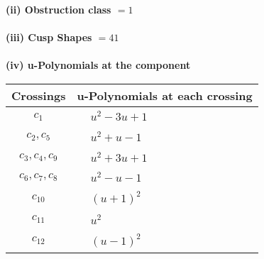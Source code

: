 \documentclass[1p]{elsarticle_modified}
\theoremstyle{definition}
\begin{document}
\flushleft \textbf{(ii) Obstruction class $= 1$}\\~\\
\flushleft \textbf{(iii) Cusp Shapes $= 41$}\\~\\
\newpage\renewcommand{\arraystretch}{1}
\flushleft \textbf{(iv) u-Polynomials at the component}\newline \\
\begin{tabular}{m{50pt}|m{274pt}}
Crossings & \hspace{64pt}u-Polynomials at each crossing \\
\hline $$\begin{aligned}c_{1}\end{aligned}$$&$\begin{aligned}
&u^2-3 u+1
\end{aligned}$\\
\hline $$\begin{aligned}c_{2},c_{5}\end{aligned}$$&$\begin{aligned}
&u^2+u-1
\end{aligned}$\\
\hline $$\begin{aligned}c_{3},c_{4},c_{9}\end{aligned}$$&$\begin{aligned}
&u^2+3 u+1
\end{aligned}$\\
\hline $$\begin{aligned}c_{6},c_{7},c_{8}\end{aligned}$$&$\begin{aligned}
&u^2- u-1
\end{aligned}$\\
\hline $$\begin{aligned}c_{10}\end{aligned}$$&$\begin{aligned}
&(u+1)^2
\end{aligned}$\\
\hline $$\begin{aligned}c_{11}\end{aligned}$$&$\begin{aligned}
&u^2
\end{aligned}$\\
\hline $$\begin{aligned}c_{12}\end{aligned}$$&$\begin{aligned}
&(u-1)^2
\end{aligned}$\\
\hline
\end{tabular}\\~\\
\end{document}
